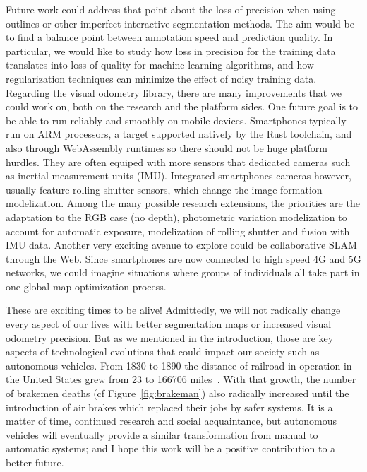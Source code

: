 Future work could address that point about the loss of precision when using outlines
or other imperfect interactive segmentation methods.
The aim would be to find a balance point between annotation speed and prediction quality.
In particular, we would like to study how loss in precision for the training data translates
into loss of quality for machine learning algorithms,
and how regularization techniques can minimize the effect of noisy training data.
Regarding the visual odometry library, there are many improvements that we could work on,
both on the research and the platform sides.
One future goal is to be able to run reliably and smoothly on mobile devices.
Smartphones typically run on ARM processors, a target supported natively
by the Rust toolchain, and also through WebAssembly runtimes so there should not be
huge platform hurdles.
They are often equiped with more sensors that dedicated cameras
such as inertial measurement units (IMU).
Integrated smartphones cameras however, usually feature rolling shutter sensors,
which change the image formation modelization.
Among the many possible research extensions, the priorities are
the adaptation to the RGB case (no depth),
photometric variation modelization to account for automatic exposure,
modelization of rolling shutter and fusion with IMU data.
Another very exciting avenue to explore could be collaborative
SLAM through the Web.
Since smartphones are now connected to high speed 4G and 5G networks,
we could imagine situations where groups of individuals all take part
in one global map optimization process.

These are exciting times to be alive!
Admittedly, we will not radically change every aspect of our lives
with better segmentation maps or increased visual odometry precision.
But as we mentioned in the introduction, those are key aspects
of technological evolutions that could impact our society such as autonomous vehicles.
From 1830 to 1890 the distance of railroad in operation in the United States
grew from 23 to 166706 miles~\cite{depew1895one}.
With that growth, the number of brakemen deaths (cf Figure~\ref{fig:brakeman}) also radically
increased until the introduction of air brakes which replaced their jobs by safer systems.
It is a matter of time, continued research and social acquaintance,
but autonomous vehicles will eventually provide a similar transformation
from manual to automatic systems; and
I hope this work will be a positive contribution to a better future.


